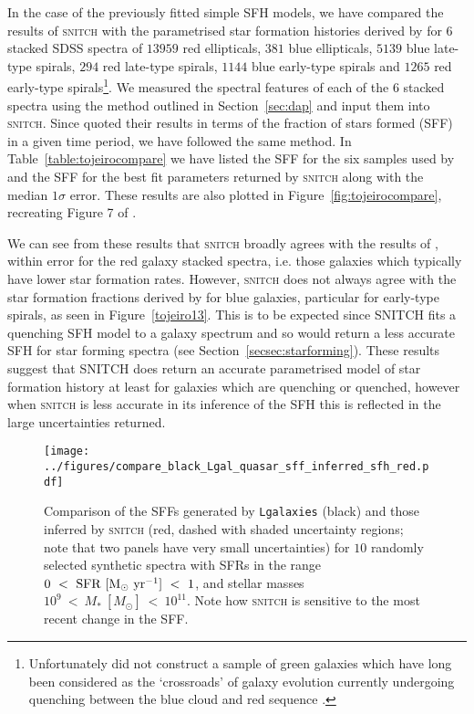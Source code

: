 \documentclass[useAMS,usenatbib]{mn2e}
\begin{document}
In the case of the previously fitted simple SFH models, we have compared the results of \textsc{snitch} with the parametrised star formation histories derived by \cite{tojeiro13} for $6$ stacked SDSS spectra of $13959$ red ellipticals, $381$ blue ellipticals, $5139$ blue late-type spirals, $294$ red late-type spirals, $1144$ blue early-type spirals and $1265$ red early-type spirals\footnote{Unfortunately \citeauthor{tojeiro13} did not construct a sample of green galaxies which have long been considered as the `crossroads' of galaxy evolution currently undergoing quenching between the blue cloud and red sequence \citep{smethurst15}.}. We measured the spectral features of each of the $6$ stacked spectra using the method outlined in Section~\ref{sec:dap} and input them into \textsc{snitch}. Since \cite{tojeiro13} quoted their results in terms of the fraction of stars formed (SFF) in a given time period, we have followed the same method. In Table~\ref{table:tojeirocompare} we have listed the SFF for the six samples used by \citeauthor{tojeiro13} and the SFF for the best fit parameters returned by \textsc{snitch} along with the median $1\sigma$ error. These results are also plotted in Figure~\ref{fig:tojeirocompare}, recreating Figure 7 of \citeauthor{tojeiro13}. 

We can see from these results that \textsc{snitch} broadly agrees with the results of \cite{tojeiro13}, within error for the red galaxy stacked spectra, i.e. those galaxies which typically have lower star formation rates. However, \textsc{snitch} does not always agree with the star formation fractions derived by \cite{tojeiro13} for blue galaxies, particular for early-type spirals, as seen in Figure~\ref{tojeiro13}. This is to be expected since \textsc{SNITCH} fits a quenching SFH model to a galaxy spectrum and so would return a less accurate SFH for star forming spectra (see Section~\ref{secsec:starforming}). These results suggest that \textsc{SNITCH} does return an accurate parametrised model of star formation history at least for galaxies which are quenching or quenched, however when \textsc{snitch} is less accurate in its inference of the SFH this is reflected in the large uncertainties returned.   

\begin{figure}
\centering
\texttt{[image: ../figures/compare\_black\_Lgal\_quasar\_sff\_inferred\_sfh\_red.pdf]}
\caption{Comparison of the SFFs generated by \texttt{Lgalaxies} (black) and those inferred by \textsc{snitch} (red, dashed with shaded uncertainty regions; note that two panels have very small uncertainties) for $10$ randomly selected synthetic spectra with SFRs in the range $0~<~\rm{SFR}~[M_{\odot}~\rm{yr}^{-1}]~<~1$, and stellar masses $10^9~<~M_{*}~[M_{\odot}]~<~10^{11}$. Note how \textsc{snitch} is sensitive to the most recent change in the SFF.}
\label{fig:lgalsfhs}
\end{figure}
\end{document}
